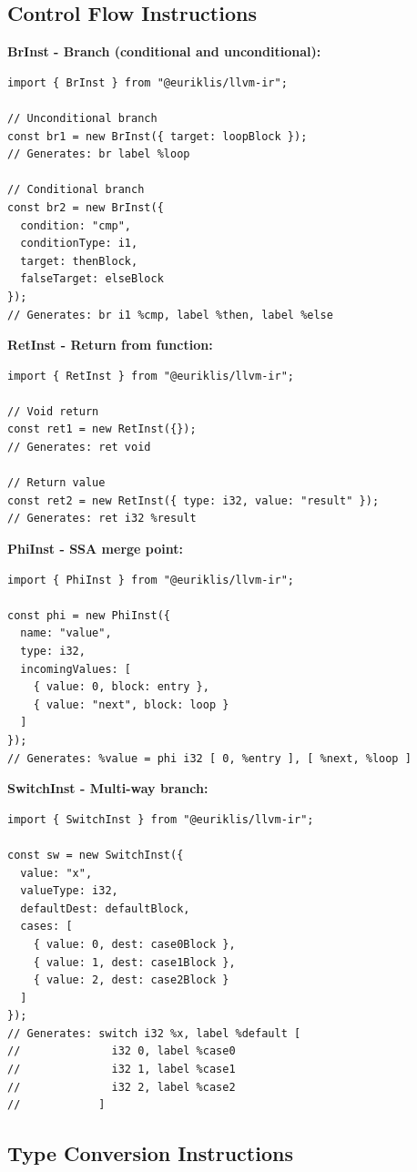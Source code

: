 \documentclass[11pt]{article}
\begin{document}
\subsection{Control Flow Instructions}

\textbf{BrInst - Branch (conditional and unconditional):}
\begin{lstlisting}[style=ts]
import { BrInst } from "@euriklis/llvm-ir";

// Unconditional branch
const br1 = new BrInst({ target: loopBlock });
// Generates: br label %loop

// Conditional branch
const br2 = new BrInst({
  condition: "cmp",
  conditionType: i1,
  target: thenBlock,
  falseTarget: elseBlock
});
// Generates: br i1 %cmp, label %then, label %else
\end{lstlisting}

\textbf{RetInst - Return from function:}
\begin{lstlisting}[style=ts]
import { RetInst } from "@euriklis/llvm-ir";

// Void return
const ret1 = new RetInst({});
// Generates: ret void

// Return value
const ret2 = new RetInst({ type: i32, value: "result" });
// Generates: ret i32 %result
\end{lstlisting}

\textbf{PhiInst - SSA merge point:}
\begin{lstlisting}[style=ts]
import { PhiInst } from "@euriklis/llvm-ir";

const phi = new PhiInst({
  name: "value",
  type: i32,
  incomingValues: [
    { value: 0, block: entry },
    { value: "next", block: loop }
  ]
});
// Generates: %value = phi i32 [ 0, %entry ], [ %next, %loop ]
\end{lstlisting}

\textbf{SwitchInst - Multi-way branch:}
\begin{lstlisting}[style=ts]
import { SwitchInst } from "@euriklis/llvm-ir";

const sw = new SwitchInst({
  value: "x",
  valueType: i32,
  defaultDest: defaultBlock,
  cases: [
    { value: 0, dest: case0Block },
    { value: 1, dest: case1Block },
    { value: 2, dest: case2Block }
  ]
});
// Generates: switch i32 %x, label %default [
//              i32 0, label %case0
//              i32 1, label %case1
//              i32 2, label %case2
//            ]
\end{lstlisting}

\subsection{Type Conversion Instructions}
\end{document}
